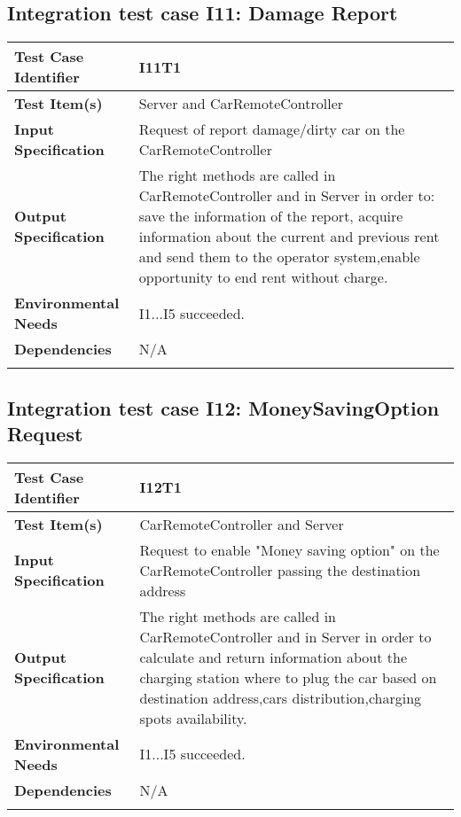 

\subsection{Integration test case I11: Damage Report}

\begin{center}
\begin{tabular*}
{\textwidth}
{l p{10.5cm}}

\hline
\textbf{Test Case Identifier} & I11T1 \\
\hline
\textbf{Test Item(s)} & Server and CarRemoteController \\
\hline
\textbf{Input Specification} & Request of report damage/dirty car on the CarRemoteController\\
\hline
\textbf{Output Specification} & The right methods are called in CarRemoteController and in Server in order to: save the information of the report, acquire information about the current and previous rent and send them to the operator system,enable opportunity to end rent without charge. \\
\hline
\textbf{Environmental Needs} & I1...I5 succeeded.\\
\hline
\textbf{Dependencies} & N/A\\
\hline
\newline
\newline
\end{tabular*}
\end{center}


\subsection{Integration test case I12: MoneySavingOption Request}

\begin{center}
\begin{tabular*}
{\textwidth}
{l p{10.5cm}}

\hline
\textbf{Test Case Identifier} & I12T1 \\
\hline
\textbf{Test Item(s)} & CarRemoteController and Server \\
\hline
\textbf{Input Specification} & Request to enable "Money saving option" on the CarRemoteController passing the destination address \\
\hline
\textbf{Output Specification} & The right methods are called in CarRemoteController and in Server in order to calculate and return information about the charging station where to plug the car based on destination address,cars distribution,charging spots availability.  \\
\hline
\textbf{Environmental Needs} & I1...I5 succeeded. \\
\hline
\textbf{Dependencies} & N/A\\
\hline
\newline
\newline
\end{tabular*}
\end{center}

